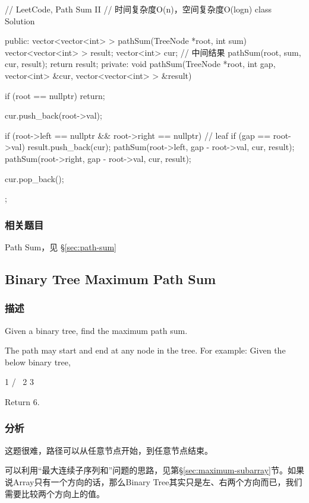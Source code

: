 \begin{Code}
// LeetCode, Path Sum II
// 时间复杂度O(n)，空间复杂度O(logn)
class Solution {
public:
    vector<vector<int> > pathSum(TreeNode *root, int sum) {
        vector<vector<int> > result;
        vector<int> cur; // 中间结果
        pathSum(root, sum, cur, result);
        return result;
    }
private:
    void pathSum(TreeNode *root, int gap, vector<int> &cur,
            vector<vector<int> > &result) {
        if (root == nullptr) return;

        cur.push_back(root->val);

        if (root->left == nullptr && root->right == nullptr) { // leaf
            if (gap == root->val)
                result.push_back(cur);
        }
        pathSum(root->left, gap - root->val, cur, result);
        pathSum(root->right, gap - root->val, cur, result);

        cur.pop_back();
    }
};
\end{Code}


\subsubsection{相关题目}
\begindot
\item Path Sum，见 \S \ref{sec:path-sum}
\myenddot


\subsection{Binary Tree Maximum Path Sum}
\label{sec:binary-tree-maximum-path-sum}


\subsubsection{描述}
Given a binary tree, find the maximum path sum.

The path may start and end at any node in the tree.
For example:
Given the below binary tree,
\begin{Code}
  1
 / \
2   3
\end{Code}
Return $6$.


\subsubsection{分析}
这题很难，路径可以从任意节点开始，到任意节点结束。

可以利用“最大连续子序列和”问题的思路，见第\S \ref{sec:maximum-subarray}节。如果说Array只有一个方向的话，那么Binary Tree其实只是左、右两个方向而已，我们需要比较两个方向上的值。


